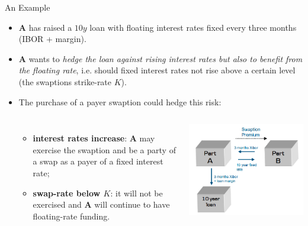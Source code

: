 \documentclass{beamer}
\begin{document}
%

\begin{frame}{An Example}
	\begin{itemize}
		\item \textbf{A} has raised a $10y$ loan with floating interest rates fixed every three months (IBOR + margin).
		\item \textbf{A} wants to \emph{hedge the loan against rising interest rates but also to benefit from the floating rate}, i.e. should fixed interest rates not rise above a certain level (the swaptions strike-rate $K$).
		\item The purchase of a payer swaption could hedge this risk: 
		\begin{columns}
			\begin{itemize}
				\item \textbf{interest rates increase}: \textbf{A} may exercise the swaption and be a party of a swap as a payer of a fixed interest rate;
				\item \textbf{swap-rate below $K$}: it will not be exercised and \textbf{A} will continue to have floating-rate funding.
			\end{itemize}
			\includegraphics[width=1.\linewidth]{swaption_example}
		\end{columns}
	\end{itemize}
\end{frame}
\end{document}
